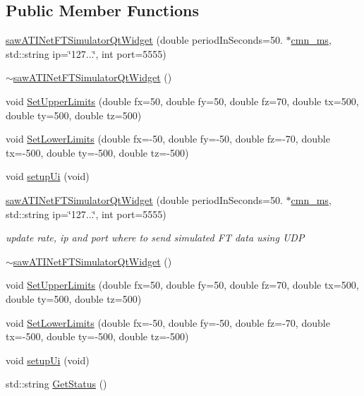 \subsection*{Public Member Functions}
\begin{DoxyCompactItemize}
\item 
\hyperlink{classsaw_a_t_i_net_f_t_simulator_qt_widget_a655d2a09e14eabc8d9de3842d3ff3228}{saw\-A\-T\-I\-Net\-F\-T\-Simulator\-Qt\-Widget} (double period\-In\-Seconds=50. $\ast$\hyperlink{cmn_units_8h_aaf4d3f2fafb9b4a95606544b9d876b4a}{cmn\-\_\-ms}, std\-::string ip=\char`\"{}127...\char`\"{}, int port=5555)
\item 
\hyperlink{classsaw_a_t_i_net_f_t_simulator_qt_widget_aba689ccdb2645011059e14bb7f882d2f}{$\sim$saw\-A\-T\-I\-Net\-F\-T\-Simulator\-Qt\-Widget} ()
\item 
void \hyperlink{classsaw_a_t_i_net_f_t_simulator_qt_widget_a68a21d0a39f4d9ceb0967392fccadf65}{Set\-Upper\-Limits} (double fx=50, double fy=50, double fz=70, double tx=500, double ty=500, double tz=500)
\item 
void \hyperlink{classsaw_a_t_i_net_f_t_simulator_qt_widget_adb78191e979b74e7f8997629219241ed}{Set\-Lower\-Limits} (double fx=-\/50, double fy=-\/50, double fz=-\/70, double tx=-\/500, double ty=-\/500, double tz=-\/500)
\item 
void \hyperlink{classsaw_a_t_i_net_f_t_simulator_qt_widget_ab2b81a455f51af9119c80cca97b20de6}{setup\-Ui} (void)
\item 
\hyperlink{classsaw_a_t_i_net_f_t_simulator_qt_widget_a655d2a09e14eabc8d9de3842d3ff3228}{saw\-A\-T\-I\-Net\-F\-T\-Simulator\-Qt\-Widget} (double period\-In\-Seconds=50. $\ast$\hyperlink{cmn_units_8h_aaf4d3f2fafb9b4a95606544b9d876b4a}{cmn\-\_\-ms}, std\-::string ip=\char`\"{}127...\char`\"{}, int port=5555)
\begin{DoxyCompactList}\small\item\em update rate, ip and port where to send simulated F\-T data using U\-D\-P \end{DoxyCompactList}\item 
\hyperlink{classsaw_a_t_i_net_f_t_simulator_qt_widget_aba689ccdb2645011059e14bb7f882d2f}{$\sim$saw\-A\-T\-I\-Net\-F\-T\-Simulator\-Qt\-Widget} ()
\item 
void \hyperlink{classsaw_a_t_i_net_f_t_simulator_qt_widget_a68a21d0a39f4d9ceb0967392fccadf65}{Set\-Upper\-Limits} (double fx=50, double fy=50, double fz=70, double tx=500, double ty=500, double tz=500)
\item 
void \hyperlink{classsaw_a_t_i_net_f_t_simulator_qt_widget_adb78191e979b74e7f8997629219241ed}{Set\-Lower\-Limits} (double fx=-\/50, double fy=-\/50, double fz=-\/70, double tx=-\/500, double ty=-\/500, double tz=-\/500)
\item 
void \hyperlink{classsaw_a_t_i_net_f_t_simulator_qt_widget_ab2b81a455f51af9119c80cca97b20de6}{setup\-Ui} (void)
\item 
std\-::string \hyperlink{classsaw_a_t_i_net_f_t_simulator_qt_widget_ac2c693bdb457d7042b35004e03d9bbc0}{Get\-Status} ()
\end{DoxyCompactItemize}
